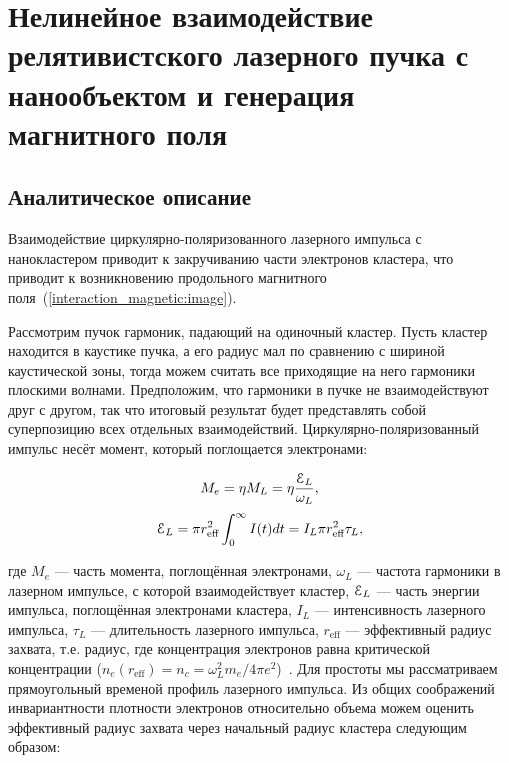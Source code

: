 \section{Нелинейное взаимодействие релятивистского лазерного пучка с нанообъектом и генерация магнитного поля}

\subsection{Аналитическое описание}

Взаимодействие циркулярно-поляризованного лазерного импульса с нанокластером приводит к закручиванию части электронов кластера, что приводит к возникновению продольного магнитного поля~(\autoref{interaction_magnetic:image}).


Рассмотрим пучок гармоник, падающий на одиночный кластер. Пусть кластер находится в каустике пучка, а его радиус мал по сравнению с шириной каустической зоны, тогда можем считать все приходящие на него гармоники плоскими волнами. Предположим, что гармоники в пучке не взаимодействуют друг с другом, так что итоговый результат будет представлять собой суперпозицию всех отдельных взаимодействий. Циркулярно-поляризованный импульс несёт момент, который поглощается электронами:

    \begin{equation}
        M_e = \eta M_L = \eta\frac{\EuScript{E}_L}{\omega_L},
    \end{equation}
    \begin{equation}
        \EuScript{E}_L = \pi r^2_{\textrm{eff}} \int_{0}^{\infty} I(t) dt = I_L \pi r^2_{\textrm{eff}}\tau_L,
        \label{Eps_L}
    \end{equation}

\noindent где $M_e$ --- часть момента, поглощённая электронами, $\omega_L$ --- частота гармоники в лазерном импульсе, с которой взаимодействует кластер, $\EuScript{E}_L$ --- часть энергии импульса, поглощённая электронами кластера, $I_L$ --- интенсивность лазерного импульса, $\tau_L$ --- длительность лазерного импульса, $r_{\textrm{eff}}$ --- эффективный радиус захвата, т.е. радиус, где концентрация электронов равна критической концентрации ($n_e(r_{\textrm{eff}}) = n_c = \omega_L^2 m_e / 4 \pi e^2$)~\cite{andr_plat_2021}. Для простоты мы рассматриваем прямоугольный временой профиль лазерного импульса. Из общих соображений инвариантности плотности электронов относительно объема можем оценить эффективный радиус захвата через начальный радиус кластера следующим образом:

